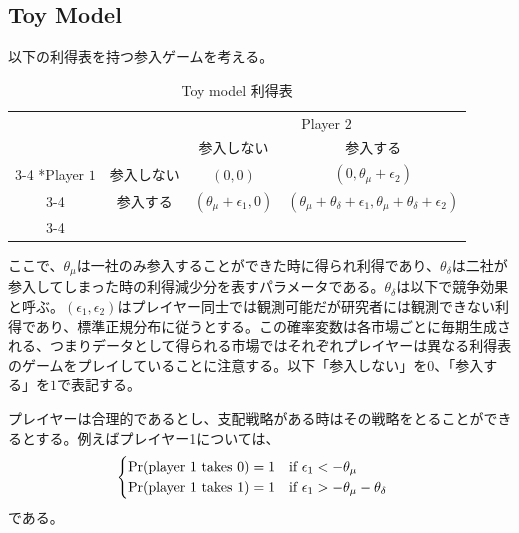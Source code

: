 \documentclass{jsarticle}
\begin{document}
\subsection{Toy Model}
以下の利得表を持つ参入ゲームを考える。
\begin{table}[h]
    \caption{Toy model 利得表}
    \centering
    \setlength{\extrarowheight}{2pt}
    \begin{tabular}{cc|c|c|}
      & \multicolumn{1}{c}{} & \multicolumn{2}{c}{Player $2$}\\
      & \multicolumn{1}{c}{} & \multicolumn{1}{c}{参入しない}  & \multicolumn{1}{c}{参入する} \\\cline{3-4}
      \multirow{2}*{Player $1$}  & 参入しない & $(0,0)$ & $(0,\theta_{\mu}+\epsilon_2)$ \\\cline{3-4}
      & 参入する & $(\theta_{\mu}+\epsilon_1,0)$ & $(\theta_{\mu}+\theta_{\delta}+\epsilon_1, \theta_{\mu}+\theta_{\delta}+\epsilon_2)$ \\\cline{3-4}
    \end{tabular}
\end{table}
ここで、$\theta_{\mu}$は一社のみ参入することができた時に得られ利得であり、$\theta_{\delta}$は二社が参入してしまった時の利得減少分を表すパラメータである。$\theta_{\delta}$は以下で競争効果と呼ぶ。$(\epsilon_1, \epsilon_2)$はプレイヤー同士では観測可能だが研究者には観測できない利得であり、標準正規分布に従うとする。この確率変数は各市場ごとに毎期生成される、つまりデータとして得られる市場ではそれぞれプレイヤーは異なる利得表のゲームをプレイしていることに注意する。以下「参入しない」を$0$、「参入する」を$1$で表記する。

プレイヤーは合理的であるとし、支配戦略がある時はその戦略をとることができるとする。例えばプレイヤー1については、
\begin{align*}
	\begin{cases}
		{\rm Pr}(\text{player 1 takes $0$}) = 1\quad \text{if}\ \epsilon_1 < -\theta_{\mu}\\
		{\rm Pr}(\text{player 1 takes $1$}) = 1\quad \text{if}\ \epsilon_1 > -\theta_{\mu} - \theta_{\delta}
	\end{cases}
\end{align*}
である。
\end{document}
